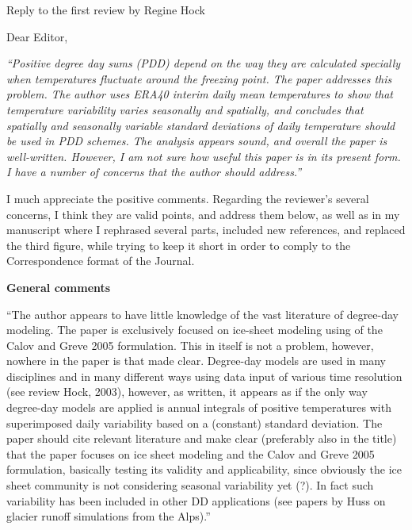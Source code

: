 \documentclass{letter}
\newcommand{\rev}[0]{\color{blue!50!black}\it}
\newcommand{\textrev}[1]{{\rev``#1''}}
\newcommand{\revpoint}[1]{{\rev\item``#1''}\\}
\begin{document}
\begin{letter}{Reply to the first review by Regine Hock}

\opening{Dear Editor,}

\textrev{Positive degree day sums (PDD) depend on the way they are calculated specially when temperatures fluctuate around the freezing point. The paper addresses this problem. The author uses ERA40 interim daily mean temperatures to show that temperature variability varies seasonally and spatially, and concludes that spatially and seasonally variable standard deviations of daily temperature should be used in PDD schemes. The analysis appears sound, and overall the paper is well-written. However, I am not sure how useful this paper is in its present form. I have a number of concerns that the author should address.}

I much appreciate the positive comments. Regarding the reviewer's several concerns, I think they are valid points, and address them below, as well as in my manuscript where I rephrased several parts, included new references, and replaced the third figure, while trying to keep it short in order to comply to the Correspondence format of the Journal.


\textbf{General comments}

\begin{enumerate}[resume]

    \revpoint{The author appears to have little knowledge of the vast literature of degree-day modeling. The paper is exclusively focused on ice-sheet modeling using of the Calov and Greve 2005 formulation. This in itself is not a problem, however, nowhere in the paper is that made clear. Degree-day models are used in many disciplines and in many different ways using data input of various time resolution (see review Hock, 2003), however, as written, it appears as if the only way degree-day models are applied is annual integrals of positive temperatures with superimposed daily variability based on a (constant) standard deviation. The paper should cite relevant literature and make clear (preferably also in the title) that the paper focuses on ice sheet modeling and the Calov and Greve 2005 formulation, basically testing its validity and applicability, since obviously the ice sheet community is not considering seasonal variability yet (?). In fact such variability has been included in other DD applications (see papers by Huss on glacier runoff simulations from the Alps).}


\end{enumerate}
\end{letter}
\end{document}
